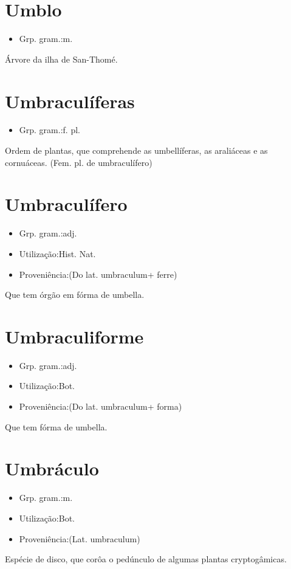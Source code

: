 \documentclass{article}
\begin{document}
\section{Umblo}
\begin{itemize}
\item {Grp. gram.:m.}
\end{itemize}
Árvore da ilha de San-Thomé.
\section{Umbraculíferas}
\begin{itemize}
\item {Grp. gram.:f. pl.}
\end{itemize}
Ordem de plantas, que comprehende as umbellíferas, as araliáceas e as cornuáceas.
(Fem. pl. de \textunderscore umbraculífero\textunderscore )
\section{Umbraculífero}
\begin{itemize}
\item {Grp. gram.:adj.}
\end{itemize}
\begin{itemize}
\item {Utilização:Hist. Nat.}
\end{itemize}
\begin{itemize}
\item {Proveniência:(Do lat. \textunderscore umbraculum\textunderscore  + \textunderscore ferre\textunderscore )}
\end{itemize}
Que tem órgão em fórma de umbella.
\section{Umbraculiforme}
\begin{itemize}
\item {Grp. gram.:adj.}
\end{itemize}
\begin{itemize}
\item {Utilização:Bot.}
\end{itemize}
\begin{itemize}
\item {Proveniência:(Do lat. \textunderscore umbraculum\textunderscore  + \textunderscore forma\textunderscore )}
\end{itemize}
Que tem fórma de umbella.
\section{Umbráculo}
\begin{itemize}
\item {Grp. gram.:m.}
\end{itemize}
\begin{itemize}
\item {Utilização:Bot.}
\end{itemize}
\begin{itemize}
\item {Proveniência:(Lat. \textunderscore umbraculum\textunderscore )}
\end{itemize}
Espécie de disco, que corôa o pedúnculo de algumas plantas cryptogâmicas.
\end{document}

